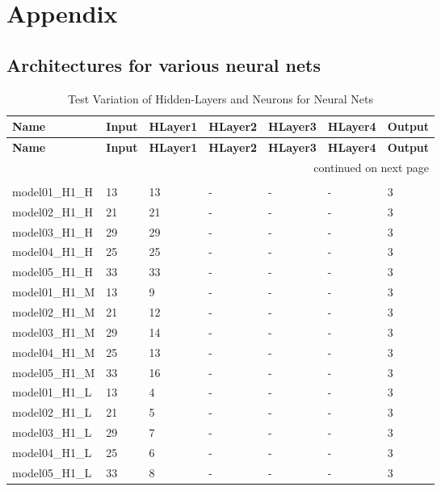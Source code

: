 
\chapter{Appendix}
\section{Architectures for various neural nets}
\label{section:appendix_a}
\begin{longtable}{|l|l|l|l|l|l|l|}
\caption{Test Variation of Hidden-Layers and Neurons for Neural Nets} \\
\hline
\textbf{Name} & \textbf{Input} & \textbf{HLayer1} & \textbf{HLayer2} & \textbf{HLayer3} & \textbf{HLayer4} & \textbf{Output} \\ 
\hline
\endfirsthead
\hline
\textbf{Name} & \textbf{Input} & \textbf{HLayer1} & \textbf{HLayer2} & \textbf{HLayer3} & \textbf{HLayer4} & \textbf{Output} \\ 
\hline
\endhead
\multicolumn{7}{r}{continued on next page}\\
\endfoot
\hline
\multicolumn{7}{r}{end of table} \\
\endlastfoot
model01\_H1\_H & 13 & 13 & - & - & - & 3 \\ \hline
model02\_H1\_H & 21 & 21 & - & - & - & 3 \\ \hline
model03\_H1\_H & 29 & 29 & - & - & - & 3 \\ \hline
model04\_H1\_H & 25 & 25 & - & - & - & 3 \\ \hline
model05\_H1\_H & 33 & 33 & - & - & - & 3 \\ \hline
model01\_H1\_M & 13 & 9 & - & - & - & 3 \\ \hline
model02\_H1\_M & 21 & 12 & - & - & - & 3 \\ \hline
model03\_H1\_M & 29 & 14 & - & - & - & 3 \\ \hline
model04\_H1\_M & 25 & 13 & - & - & - & 3 \\ \hline
model05\_H1\_M & 33 & 16 & - & - & - & 3 \\ \hline
model01\_H1\_L & 13 & 4 & - & - & - & 3 \\ \hline
model02\_H1\_L & 21 & 5 & - & - & - & 3 \\ \hline
model03\_H1\_L & 29 & 7 & - & - & - & 3 \\ \hline
model04\_H1\_L & 25 & 6 & - & - & - & 3 \\ \hline
model05\_H1\_L & 33 & 8 & - & - & - & 3 \\ \hline

\end{longtable}
